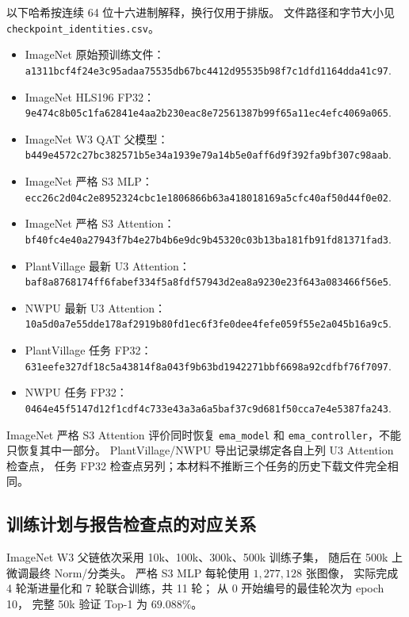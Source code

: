 以下哈希按连续 64 位十六进制解释，换行仅用于排版。
文件路径和字节大小见 \texttt{checkpoint\_identities.csv}。
\begin{itemize}
\item ImageNet 原始预训练文件：\newline \texttt{a1311bcf4f24e3c9\allowbreak{}5adaa75535db67bc\allowbreak{}4412d95535b98f7c\allowbreak{}1dfd1164dda41c97}.
\item ImageNet HLS196 FP32：\newline \texttt{9e474c8b05c1fa62\allowbreak{}841e4aa2b230eac8\allowbreak{}e72561387b99f65a\allowbreak{}11ec4efc4069a065}.
\item ImageNet W3 QAT 父模型：\newline \texttt{b449e4572c27bc38\allowbreak{}2571b5e34a1939e7\allowbreak{}9a14b5e0aff6d9f3\allowbreak{}92fa9bf307c98aab}.
\item ImageNet 严格 S3 MLP：\newline \texttt{ecc26c2d04c2e895\allowbreak{}2324cbc1e1806866\allowbreak{}b63a418018169a5c\allowbreak{}fc40af50d44f0e02}.
\item ImageNet 严格 S3 Attention：\newline \texttt{bf40fc4e40a27943\allowbreak{}f7b4e27b4b6e9dc9\allowbreak{}b45320c03b13ba18\allowbreak{}1fb91fd81371fad3}.
\item PlantVillage 最新 U3 Attention：\newline \texttt{baf8a8768174ff6f\allowbreak{}abef334f5a8fdf57\allowbreak{}943d2ea8a9230e23\allowbreak{}f643a083466f56e5}.
\item NWPU 最新 U3 Attention：\newline \texttt{10a5d0a7e55dde17\allowbreak{}8af2919b80fd1ec6\allowbreak{}f3fe0dee4fefe059\allowbreak{}f55e2a045b16a9c5}.
\item PlantVillage 任务 FP32：\newline \texttt{631eefe327df18c5\allowbreak{}a43814f8a043f9b6\allowbreak{}3bd1942271bbf669\allowbreak{}8a92cdfbf76f7097}.
\item NWPU 任务 FP32：\newline \texttt{0464e45f5147d12f\allowbreak{}1cdf4c733e43a3a6\allowbreak{}a5baf37c9d681f50\allowbreak{}cca7e4e5387fa243}.
\end{itemize}
ImageNet 严格 S3 Attention 评价同时恢复
\texttt{ema\_model} 和 \texttt{ema\_controller}，不能只恢复其中一部分。
PlantVillage/NWPU 导出记录绑定各自上列 U3 Attention 检查点，
任务 FP32 检查点另列；本材料不推断三个任务的历史下载文件完全相同。

\subsection{训练计划与报告检查点的对应关系}
ImageNet W3 父链依次采用 10k、100k、300k、500k 训练子集，
随后在 500k 上微调最终 Norm/分类头。
严格 S3 MLP 每轮使用 $1{,}277{,}128$ 张图像，
实际完成 4 轮渐进量化和 7 轮联合训练，共 11 轮；
从 0 开始编号的最佳轮次为 epoch 10，
完整 50k 验证 Top-1 为 $69.088\%$。

